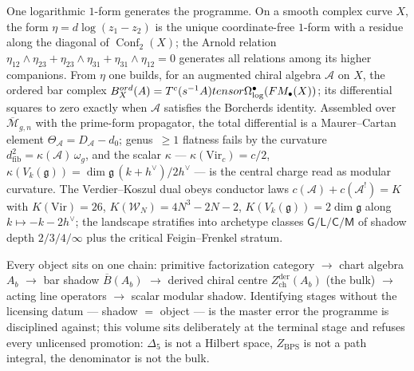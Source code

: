 \documentclass[11pt]{article}
\providecommand{\cA}{\mathcal{A}}
\providecommand{\cW}{\mathcal{W}}
\providecommand{\fg}{\mathfrak{g}}
\providecommand{\barB}{\overline{B}}
\providecommand{\Mbar}{\overline{\mathcal{M}}}
\providecommand{\FM}{\overline{\mathrm{FM}}}
\providecommand{\Vir}{\mathrm{Vir}}
\providecommand{\Zder}{Z^{\mathrm{der}}_{\mathrm{ch}}}
\providecommand{\Dfive}{\Delta_5}
\providecommand{\Conf}{\operatorname{Conf}}
\begin{document}
One logarithmic $1$-form generates the programme. On a smooth complex
curve $X$, the form $\eta=d\log(z_1-z_2)$ is the unique
coordinate-free $1$-form with a residue along the diagonal of
$\Conf_2(X)$; the Arnold relation
$\eta_{12}\wedge\eta_{23}+\eta_{23}\wedge\eta_{31}
+\eta_{31}\wedge\eta_{12}=0$ generates all relations among its higher
companions. From $\eta$ one builds, for an augmented chiral algebra
$\cA$ on $X$, the ordered bar complex
$\barB^{\mathrm{ord}}_X(\cA)=T^c(s^{-1}\bar\cA)\otimes
\Omega^\bullet_{\log}(\FM_\bullet(X))$; its differential squares to
zero exactly when $\cA$ satisfies the Borcherds identity. Assembled
over $\Mbar_{g,n}$ with the prime-form propagator, the total
differential is a Maurer--Cartan element $\Theta_\cA=D_\cA-d_0$;
genus~$\ge1$ flatness fails by the curvature
$d^2_{\mathrm{fib}}=\kappa(\cA)\,\omega_g$, and the scalar $\kappa$
--- $\kappa(\Vir_c)=c/2$,
$\kappa(V_k(\fg))=\dim\fg\,(k+h^\vee)/2h^\vee$ --- is the central
charge read as modular curvature. The Verdier--Koszul dual obeys
conductor laws $c(\cA)+c(\cA^!)=K$ with $K(\Vir)=26$,
$K(\cW_N)=4N^3-2N-2$, $K(V_k(\fg))=2\dim\fg$ along
$k\mapsto-k-2h^\vee$; the landscape stratifies into archetype classes
$\mathsf G/\mathsf L/\mathsf C/\mathsf M$ of shadow depth
$2/3/4/\infty$ plus the critical Feigin--Frenkel stratum.

Every object sits on one chain: primitive factorization category
$\to$ chart algebra $A_b$ $\to$ bar shadow $\barB(A_b)$ $\to$ derived
chiral centre $\Zder(A_b)$ \textup{(the bulk)} $\to$ acting line
operators $\to$ scalar modular shadow. Identifying stages without the
licensing datum --- shadow $=$ object --- is the master error the
programme is disciplined against; this volume sits deliberately at
the terminal stage and refuses every unlicensed promotion: $\Dfive$
is not a Hilbert space, $Z_{\mathrm{BPS}}$ is not a path integral,
the denominator is not the bulk.
\end{document}
